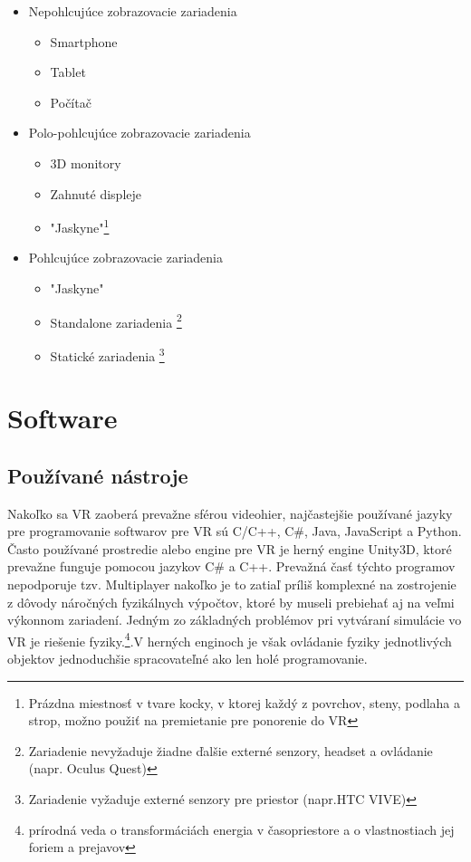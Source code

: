 \documentclass[10pt,twoside,slovak,a4paper]{article}										%
\begin{document}
\begin{itemize}
\item Nepohlcujúce zobrazovacie zariadenia
	\begin{itemize}
	\item Smartphone       
	\item Tablet
	\item Počítač
	\end{itemize}	
\item Polo-pohlcujúce zobrazovacie zariadenia
	\begin{itemize}
	\item 3D monitory
	\item Zahnuté displeje
	\item "Jaskyne"\footnote{Prázdna miestnosť v tvare kocky, v ktorej každý z povrchov, steny, podlaha a strop, možno použiť na premietanie pre ponorenie do VR}
	\end{itemize}	
\item Pohlcujúce zobrazovacie zariadenia
	\begin{itemize}
	\item "Jaskyne"
	\item Standalone zariadenia \footnote{Zariadenie nevyžaduje žiadne ďalšie externé senzory, headset a ovládanie (napr. Oculus Quest)}
	\item Statické zariadenia \footnote {Zariadenie vyžaduje externé senzory pre priestor (napr.HTC VIVE)}
	\end{itemize}
\end{itemize}

\section{Software} \label{SW}
\subsection{Používané nástroje} \label{SW:tools}
Nakoľko sa VR zaoberá prevažne sférou videohier, najčastejšie používané jazyky pre programovanie softwarov pre VR sú C/C++, C\#, Java, JavaScript a Python. Často používané prostredie alebo engine pre VR je herný engine Unity3D, ktoré prevažne funguje pomocou jazykov C\# a C++. Prevažná časť týchto programov nepodporuje tzv. Multiplayer nakoľko je to zatiaľ príliš komplexné na zostrojenie z dôvody náročných fyzikálnych výpočtov, ktoré by museli prebiehať aj na veľmi výkonnom zariadení.
Jedným zo základných problémov pri vytváraní simulácie vo VR je riešenie fyziky.\footnote{ prírodná veda o transformáciách energia v časopriestore a o vlastnostiach jej foriem a prejavov}.V herných enginoch je však ovládanie fyziky jednotlivých objektov jednoduchšie spracovateľné ako len holé programovanie.
\end{document}

